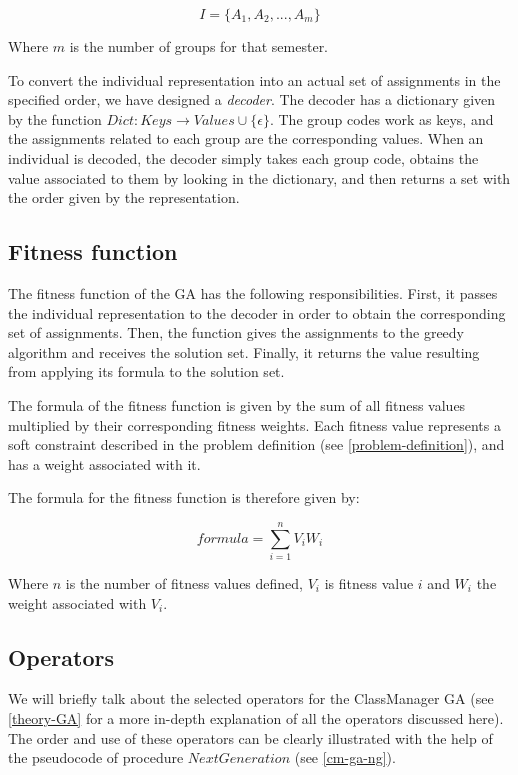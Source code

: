 \begin{equation}
    I = \{ A_{1}, A_{2}, ..., A_{m}\}
\end{equation}

Where $m$ is the number of groups for that semester.

To convert the individual representation into an actual set of assignments in the specified order, we have designed a \textit{decoder}. The decoder has a dictionary given by the function $Dict: Keys \rightarrow Values \cup \{ \epsilon \}$. The group codes work as keys, and the assignments related to each group are the corresponding values. When an individual is decoded, the decoder simply takes each group code, obtains the value associated to them by looking in the dictionary, and then returns a set with the order given by the representation.


\subsection{Fitness function}

The fitness function of the GA has the following responsibilities. First, it passes the individual representation to the decoder in order to obtain the corresponding set of assignments. Then, the function gives the assignments to the greedy algorithm and receives the solution set. Finally, it returns the value resulting from applying its formula to the solution set. 

The formula of the fitness function is given by the sum of all fitness values multiplied by their corresponding fitness weights. Each fitness value represents a soft constraint described in the problem definition (see \ref{problem-definition}), and has a weight associated with it. 

The formula for the fitness function is therefore given by:

\begin{equation}
    formula = \sum_{i=1}^{n} V_{i} W_{i}
\end{equation}

Where $n$ is the number of fitness values defined, $V_{i}$ is fitness value $i$ and $W_{i}$ the weight associated with $V_{i}$.


\subsection{Operators}

We will briefly talk about the selected operators for the ClassManager GA (see \ref{theory-GA} for a more in-depth explanation of all the operators discussed here). The order and use of these operators can be clearly illustrated with the help of the pseudocode of procedure $NextGeneration$ (see \ref{cm-ga-ng}).


